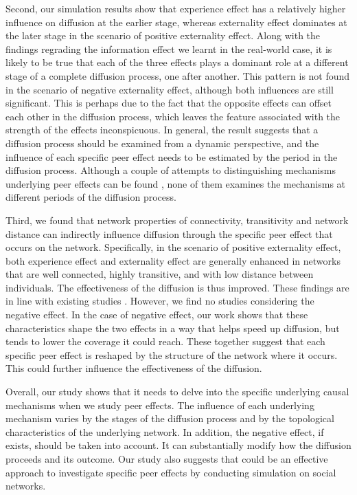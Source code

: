 \documentclass{bmcart}
\begin{document}
Second, our simulation results show that experience effect has a relatively higher influence on diffusion at the earlier stage, whereas externality effect dominates at the later stage in the scenario of positive externality effect. Along with the findings regrading the information effect we learnt in the real-world case, it is likely to be true that each of the three effects plays a dominant role at a different stage of a complete diffusion process, one after another. This pattern is not found in the scenario of negative externality effect, although both influences are still significant. This is perhaps due to the fact that the opposite effects can offset each other in the diffusion process, which leaves the feature associated with the strength of the effects inconspicuous. In general, the result suggests that a diffusion process should be examined from a dynamic perspective, and the influence of each specific peer effect needs to be estimated by the period in the diffusion process. Although a couple of attempts to distinguishing mechanisms underlying peer effects can be found \cite{Banerjee2013, Bursztyn2014}, none of them examines the mechanisms at different periods of the diffusion process. 

Third, we found that network properties of connectivity, transitivity and network distance can indirectly influence diffusion through the specific peer effect that occurs on the network. Specifically, in the scenario of positive externality effect, both experience effect and externality effect are generally enhanced in networks that are well connected, highly transitive, and with low distance between individuals. The effectiveness of the diffusion is thus improved. These findings are in line with existing studies \cite{Janssen2003, Laciana2013, Peres2014}. However, we find no studies considering the negative effect. In the case of negative effect, our work shows that these characteristics shape the two effects in a way that helps speed up diffusion, but tends to lower the coverage it could reach. These together suggest that each specific peer effect is reshaped by the structure of the network where it occurs. This could further influence the effectiveness of the diffusion.

Overall, our study shows that it needs to delve into the specific underlying causal mechanisms when we study peer effects. The influence of each underlying mechanism varies by the stages of the diffusion process and by the topological characteristics of the underlying network. In addition, the negative effect, if exists, should be taken into account. It can substantially modify how the diffusion proceeds and its outcome. Our study also suggests that could be an effective approach to investigate specific peer effects by conducting simulation on social networks.
\end{document}
